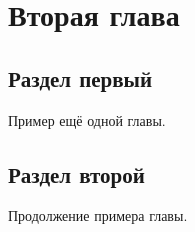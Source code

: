 \chapter{Вторая глава}

\section{Раздел первый}

Пример ещё одной главы.

\section{Раздел второй}

Продолжение примера главы.
